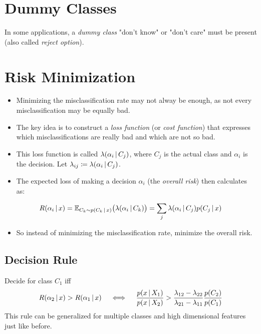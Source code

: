 	\section{Dummy Classes}
		In some applications, a \emph{dummy class} "don't know" or "don't care" must be present (also called \emph{reject option}).

	\section{Risk Minimization}
		\begin{itemize}
			\item Minimizing the misclassification rate may not alway be enough, as not every misclassification may be equally bad.
			\item The key idea is to construct a \emph{loss function} (or \emph{cost function}) that expresses which misclassifications are really bad and which are not so bad.
			\item This loss function is called \( \lambda(\alpha_i \,\vert\, C_j) \), where \(C_j\) is the actual class and \(\alpha_i\) is the decision. Let \( \lambda_{ij} \coloneqq \lambda(\alpha_i \,\vert\, C_j) \).
			\item The expected loss of making a decision \(\alpha_i\) (the \emph{overall risk}) then calculates as:
		\end{itemize}
		\begin{equation}
			R(\alpha_i \,\vert\, x) = \mathbb{E}_{C_k \sim p(C_k \,\vert\, x)} \big(\lambda(\alpha_i \,\vert\, C_k)\big) = \sum_j \lambda(\alpha_i \,\vert\, C_j) p(C_j \,\vert\, x)
		\end{equation}
		\begin{itemize}
			\item So instead of minimizing the misclassification rate, minimize the overall risk.
		\end{itemize}

		\subsection{Decision Rule}
			Decide for class \(C_1\) iff
			\begin{equation}
				R(\alpha_2 \,\vert\, x) > R(\alpha_1 \,\vert\, x) \quad\iff\quad \frac{p(x \,\vert\, X_1)}{p(x \,\vert\, X_2)} > \frac{\lambda_{12} - \lambda_{22}}{\lambda_{21} - \lambda_{11}} \frac{p(C_2)}{p(C_1)}
			\end{equation}
			This rule can be generalized for multiple classes and high dimensional features just like before.

